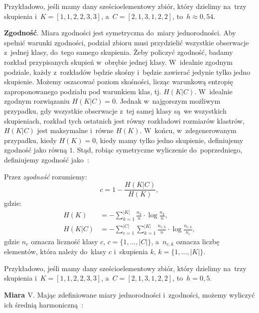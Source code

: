 \documentclass{praca1}
\begin{document}
Przykładowo, jeśli mamy dany sześcioelementowy zbiór, który dzielimy na~trzy skupienia i~$K = [1, 1, 2, 2, 3, 3]$, a~$C = [2, 1, 3, 1, 2, 2]$, to~$h \approx 0,54$.

\textbf{Zgodność}. Miara zgodności jest symetryczna do~miary jednorodności. Aby spełnić warunki zgodności, podział zbioru musi przydzielić wszystkie obserwacje z~jednej klasy, do~tego samego skupienia. Żeby policzyć zgodność, badamy rozkład przypisanych skupień w~obrębie jednej klasy. W~idealnie zgodnym podziale, każdy z~rozkładów będzie skośny i~będzie zawierać jedynie tylko jedno skupienie. Możemy oszacować poziom skośności, licząc warunkową entropię zaproponowanego podziału pod warunkiem klas, tj. $H(K|C)$. W~idealnie zgodnym rozwiązaniu $H(K|C) = 0$. Jednak w~najgorszym możliwym przypadku, gdy wszystkie obserwacje z~tej samej klasy są~we wszystkich skupieniach, rozkład tych ostatnich jest równy rozkładowi rozmiarów klastrów, $H(K|C)$ jest maksymalne i~równe $H(K)$. W~końcu, w~zdegenerowanym przypadku, kiedy $H(K) = 0$, kiedy mamy tylko jedno skupienie, definiujemy zgodność jako równą $1$. Stąd, robiąc symetryczne wyliczenie do~poprzedniego, definiujemy zgodność jako~\cite{Rosenberg2007:vmeasure}:

\begin{definition}
Przez \emph{zgodność} rozumiemy:
\begin{equation}
c = %
1 - \frac{H(K|C)}{H(K)}, %
\end{equation}
gdzie:
\begin{align*}
H(K) & = - \sum\limits_{k = 1}^{|K|}\frac{n_k}{n}\cdot \log{\frac{n_k}{n}},  \\
H(K|C) & = - \sum\limits_{c = 1}^{|C|}\sum\limits_{k = 1}^{|K|}\frac{n_{c,k}}{n}\cdot \log{\frac{n_{c,k}}{n_c}},
\end{align*}
gdzie $n_c$ oznacza liczność klasy $c$, $c = \{1,\ldots, |C|\}$, a~$n_{c,k}$ oznacza liczbę elementów, która należy do~klasy $c$ i~skupienia $k$, $k = \{1,\ldots, |K|\}$.
\end{definition}

Przykładowo, jeśli mamy dany sześcioelementowy zbiór, który dzielimy na~trzy skupienia i~$K = [1, 1, 2, 2, 3, 3]$, a~$C = [2, 1, 3, 1, 2, 2]$, to~$h = 0,5$.

\textbf{Miara $\textrm{V}$}. Mając zdefiniowane miary jednorodności i~zgodności, możemy wyliczyć ich średnią harmoniczną~\cite{Rosenberg2007:vmeasure}:
\end{document}
